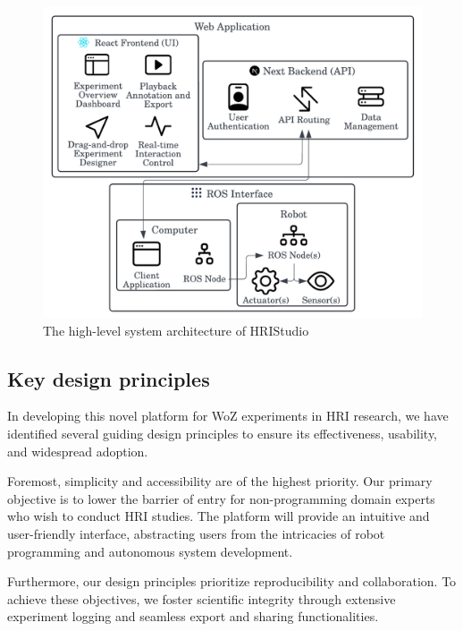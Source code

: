 \documentclass[letterpaper, 10 pt, conference]{ieeeconf}
\begin{document}
\begin{figure}[ht]
   \vskip -0.3cm
    \begin{center}
        \includegraphics[width=0.4\paperwidth]{assets/diagrams/highlevelarchitecture}
        \vskip -0.3cm
        \caption{The high-level system architecture of HRIStudio}
        \label{highlevelarchitecture}
    \end{center}
     \vskip -0.4cm
\end{figure}

\subsection{Key design principles}

In developing this novel platform for WoZ experiments in HRI research, we have identified several guiding design principles to ensure its effectiveness, usability, and widespread adoption.

Foremost, simplicity and accessibility are of the highest priority. Our primary objective is to lower the barrier of entry for non-programming domain experts who wish to conduct HRI studies. The platform will provide an intuitive and user-friendly interface, abstracting users from the intricacies of robot programming and autonomous system development.

Furthermore, our design principles prioritize reproducibility and collaboration. To achieve these objectives, we foster scientific integrity through extensive experiment logging and seamless export and sharing functionalities.
\end{document}
